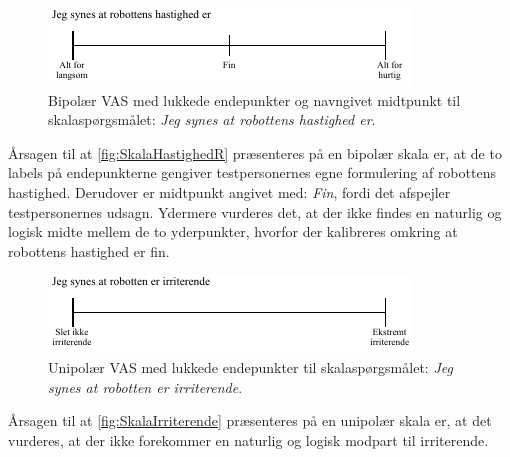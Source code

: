 %
\begin{figure}[H]
\centering
\includegraphics[width =\textwidth]{Figure/UdvalgteSkalaer/HastighedR} 
\caption{Bipolær VAS med lukkede endepunkter og navngivet midtpunkt til skalaspørgsmålet: \textit{Jeg synes at robottens hastighed er}.}
\label{fig:SkalaHastighedR}
\end{figure}
\noindent
%
Årsagen til at \autoref{fig:SkalaHastighedR} præsenteres på en bipolær skala er, at de to labels på endepunkterne gengiver testpersonernes egne formulering af robottens hastighed. Derudover er midtpunkt angivet med: \textit{Fin}, fordi det afspejler testpersonernes udsagn. Ydermere vurderes det, at der ikke findes en naturlig og logisk midte mellem de to yderpunkter, hvorfor der kalibreres omkring at robottens hastighed er fin. 
%
\begin{figure}[H]
\centering
\includegraphics[width =\textwidth]{Figure/UdvalgteSkalaer/Irriterende} 
\caption{Unipolær VAS med lukkede endepunkter til skalaspørgsmålet: \textit{Jeg synes at robotten er irriterende}.}
\label{fig:SkalaIrriterende}
\end{figure}
\noindent
%
Årsagen til at \autoref{fig:SkalaIrriterende} præsenteres på en unipolær skala er, at det vurderes, at der ikke forekommer en naturlig og logisk modpart til irriterende.

